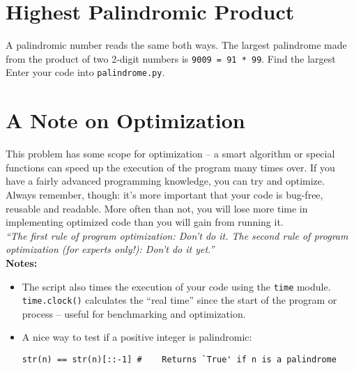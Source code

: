 \documentclass{article}
\begin{document}
\section*{Highest Palindromic Product}

A palindromic number reads the same both ways. The largest palindrome made from
the product of two 2-digit numbers is \texttt{9009 = 91 * 99}. Find the largest 
\newline \\ Enter your code into \texttt{palindrome.py}. 
\section*{A Note on Optimization}
This problem has some scope for optimization -- a smart algorithm or special
functions can speed up the execution of the program many times over. If you have 
a fairly advanced programming knowledge, you can try and optimize.
\newline \\ Always remember, though: it's more important that your code is bug-free,
reusable and readable. More often than not, you will lose more time in
implementing optimized code than you will gain from running it.
\newline \\ \emph{``The first rule of program optimization: Don't do it. 
The second rule of program optimization (for experts only!): Don't do it yet.''}
\newline \\
\textbf{Notes: }
\begin{itemize}
\item The script also times the
execution of your code using the \texttt{time} module. \texttt{time.clock()} 
calculates the ``real time'' since the start of the program or process -- useful 
for benchmarking and optimization.
\item A nice way to test if a positive integer is palindromic:
\begin{verbatim}str(n) == str(n)[::-1] #	Returns `True' if n is a palindrome \end{verbatim}
\end{itemize}
\end{document}
